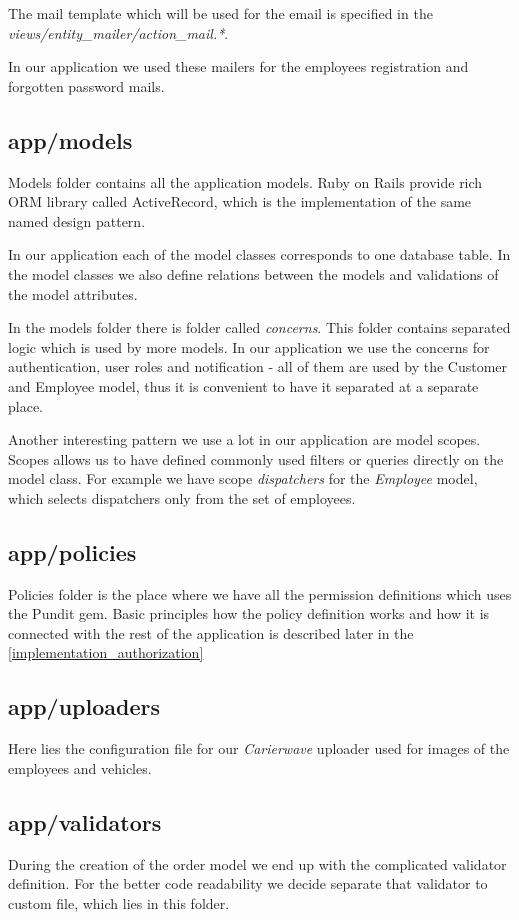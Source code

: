 		 The mail template which will be used for the email is specified in the \textit{views/entity\_mailer/action\_mail.*}.
		 
		 In our application we used these mailers for the employees registration and forgotten password mails.
	\subsection{app/models}
		Models folder contains all the application models. Ruby on Rails provide rich ORM library called ActiveRecord, which is the implementation of the same named design pattern. 
		
		In our application each of the model classes corresponds to one database table. In the model classes we also define relations between the models and validations of the model attributes. 
		
		In the models folder there is folder called \textit{concerns}. This folder contains separated logic which is used by more models. In our application we use the concerns for authentication, user roles and notification - all of them are used by the Customer and Employee model, thus it is convenient to have it separated at a separate place.
		
		Another interesting pattern we use a lot in our application are model scopes. Scopes allows us to have defined commonly used filters or queries directly on the model class. For example we have scope \textit{dispatchers} for the \textit{Employee} model, which selects dispatchers only from the set of employees.
		
	\subsection{app/policies}
		Policies folder is the place where we have all the permission definitions which uses the Pundit gem. Basic principles how the policy definition works and how it is connected with the rest of the application is described later in the \ref{implementation_authorization} 
	\subsection{app/uploaders}
		Here lies the configuration file for our \textit{Carierwave} uploader used for images of the employees and vehicles. 
	\subsection{app/validators}
		During the creation of the order model we end up with the complicated validator definition. For the better code readability we decide separate that validator to custom file, which lies in this folder. 
		
